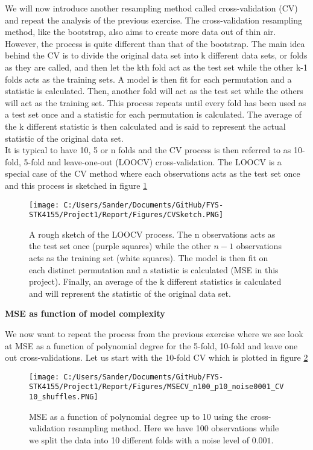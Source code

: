 \documentclass[12pt,a4paper]{article}
\begin{document}
\noindent We will now introduce another resampling method called cross-validation (CV) and repeat the analysis of the previous exercise. The cross-validation resampling method, like the bootstrap, also aims to create more data out of thin air. However, the process is quite different than that of the bootstrap. The main idea behind the CV is to divide the original data set into k different data sets, or folds as they are called, and then let the kth fold act as the test set while the other k-1 folds acts as the training sets. A model is then fit for each permutation and a statistic is calculated. Then, another fold will act as the test set while the others will act as the training set. This process repeats until every fold has been used as a test set once and a statistic for each permutation is calculated. The average of the k different statistic is then calculated and is said to represent the actual statistic of the original data set. 
\\
It is typical to have 10, 5 or n folds and the CV process is then referred to as 10-fold, 5-fold and leave-one-out (LOOCV) cross-validation. The LOOCV is a special case of the CV method where each observations acts as the test set once and this process is sketched in figure \ref{fig:CVsketch}

\begin{figure}[H]
\centering
\texttt{[image: C:/Users/Sander/Documents/GitHub/FYS-STK4155/Project1/Report/Figures/CVSketch.PNG]}
\caption{\label{fig:CVsketch} A rough sketch of the LOOCV process. The n observations acts as the test set once (purple squares) while the other $n-1$ observations acts as the training set (white squares). The model is then fit on each distinct permutation and a statistic is calculated (MSE in this project). Finally, an average of the k different statistics is calculated and will represent the statistic of the original data set.}
\end{figure}

\begin{center}
\large{\textbf{MSE as function of model complexity}}
\end{center}

\noindent We now want to repeat the process from the previous exercise where we see look at MSE as a function of polynomial degree for the 5-fold, 10-fold and leave one out cross-validations. Let us start with the 10-fold CV which is plotted in figure \ref{fig:MSECV1}

\begin{figure}[H]
\centering
\texttt{[image: C:/Users/Sander/Documents/GitHub/FYS-STK4155/Project1/Report/Figures/MSECV\_n100\_p10\_noise0001\_CV10\_shuffles.PNG]}
\caption{\label{fig:MSECV1} MSE as a function of polynomial degree up to 10 using the cross-validation resampling method. Here we have 100 observations while we split the data into 10 different folds with a noise level of $0.001$.}
\end{figure}
\end{document}
